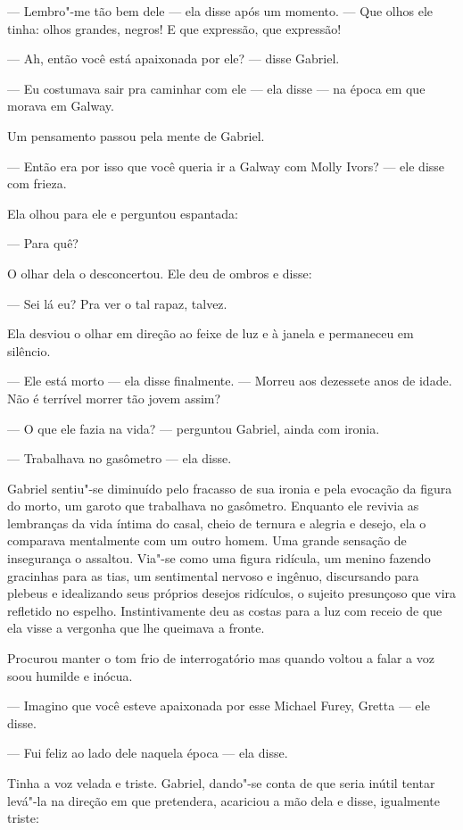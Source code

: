 --- Lembro"-me tão bem dele --- ela disse após um momento.  --- Que olhos ele
tinha: olhos grandes, negros!  E que expressão, que expressão!

--- Ah, então você está apaixonada por ele? --- disse Gabriel.

--- Eu costumava sair pra caminhar com ele --- ela disse --- na época em que
morava em Galway.

Um pensamento passou pela mente de Gabriel.

--- Então era por isso que você queria ir a Galway com Molly Ivors? --- ele
disse com frieza.

Ela olhou para ele e perguntou espantada:

--- Para quê?

O olhar dela o desconcertou.  Ele deu de ombros e disse:

--- Sei lá eu?  Pra ver o tal rapaz, talvez.

Ela desviou o olhar em direção ao feixe de luz e à janela e permaneceu em
silêncio.

--- Ele está morto --- ela disse finalmente.  --- Morreu aos dezessete anos de
idade.  Não é terrível morrer tão jovem assim?

--- O que ele fazia na vida? --- perguntou Gabriel, ainda com ironia.

--- Trabalhava no gasômetro --- ela disse.

Gabriel sentiu"-se diminuído pelo fracasso de sua ironia e pela evocação da
figura do morto, um garoto que trabalhava no gasômetro.  Enquanto ele revivia
as lembranças da vida íntima do casal, cheio de ternura e alegria e desejo, ela
o comparava mentalmente com um outro homem.  Uma grande sensação de insegurança
o assaltou.  Via"-se como uma figura ridícula, um menino fazendo gracinhas para
as tias, um sentimental nervoso e ingênuo, discursando para plebeus e
idealizando seus próprios desejos ridículos, o sujeito presunçoso que vira
refletido no espelho.  Instintivamente deu as costas para a luz com receio de
que ela visse a vergonha que lhe queimava a fronte.

Procurou manter o tom frio de interrogatório mas quando voltou a falar a voz
soou humilde e inócua.

--- Imagino que você esteve apaixonada por esse Michael Furey, Gretta --- ele
disse.

--- Fui feliz ao lado dele naquela época --- ela disse.

Tinha a voz velada e triste.  Gabriel, dando"-se conta de que seria inútil
tentar levá"-la na direção em que pretendera, acariciou a mão dela e disse,
igualmente triste:

